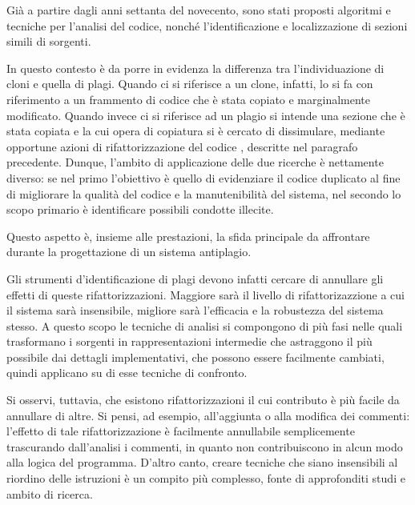 Già a partire dagli anni settanta del novecento, sono stati proposti algoritmi e tecniche per l'analisi del codice, nonché l'identificazione e localizzazione di sezioni simili di sorgenti.

In questo contesto è da porre in evidenza la differenza tra l'individuazione di cloni e quella di plagi.
%
Quando ci si riferisce a un clone, infatti, lo si fa con riferimento a un frammento di codice che è stata copiato e marginalmente modificato. 
%
Quando invece ci si riferisce ad un plagio si intende una sezione che è stata copiata e la cui opera di copiatura si è cercato di dissimulare, mediante opportune azioni di rifattorizzazione del codice \cite{cpdp}, descritte nel paragrafo precedente.
%
Dunque, l'ambito di applicazione delle due ricerche è nettamente diverso: se nel primo l'obiettivo è quello di evidenziare il codice duplicato al fine di migliorare la qualità del codice e la manutenibilità del sistema, nel secondo lo scopo primario è identificare possibili condotte illecite.

Questo aspetto è, insieme alle prestazioni, la sfida principale da affrontare durante la progettazione di un sistema antiplagio.

Gli strumenti d'identificazione di plagi devono infatti cercare di annullare gli effetti di queste rifattorizzazioni.
%
Maggiore sarà il livello di rifattorizazzione a cui il sistema sarà insensibile, migliore sarà l'efficacia e la robustezza del sistema stesso.
%
A questo scopo le tecniche di analisi si compongono di più fasi nelle quali trasformano i sorgenti in rappresentazioni intermedie che astraggono il più possibile dai dettagli implementativi, che possono essere facilmente cambiati, quindi applicano su di esse tecniche di confronto.

Si osservi, tuttavia, che esistono rifattorizzazioni il cui contributo è più facile da annullare di altre. 
%
Si pensi, ad esempio, all'aggiunta o alla modifica dei commenti: l'effetto di tale rifattorizzazione è facilmente annullabile semplicemente trascurando dall'analisi i commenti, in quanto non contribuiscono in alcun modo alla logica del programma. 
%
D'altro canto, creare tecniche che siano insensibili al riordino delle istruzioni è un compito più complesso, fonte di approfonditi studi e ambito di ricerca.

